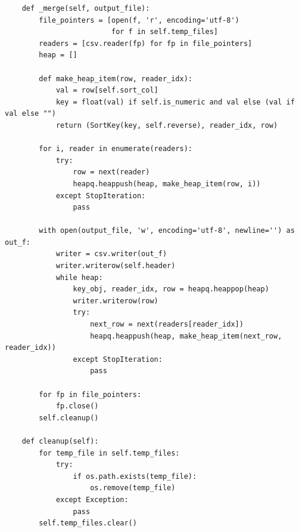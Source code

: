 \documentclass[oneside,a4paper,14pt]{extarticle}
\begin{document}
\begin{verbatim}
    def _merge(self, output_file):
        file_pointers = [open(f, 'r', encoding='utf-8')
                         for f in self.temp_files]
        readers = [csv.reader(fp) for fp in file_pointers]
        heap = []

        def make_heap_item(row, reader_idx):
            val = row[self.sort_col]
            key = float(val) if self.is_numeric and val else (val if val else "")
            return (SortKey(key, self.reverse), reader_idx, row)

        for i, reader in enumerate(readers):
            try:
                row = next(reader)
                heapq.heappush(heap, make_heap_item(row, i))
            except StopIteration:
                pass

        with open(output_file, 'w', encoding='utf-8', newline='') as out_f:
            writer = csv.writer(out_f)
            writer.writerow(self.header)
            while heap:
                key_obj, reader_idx, row = heapq.heappop(heap)
                writer.writerow(row)
                try:
                    next_row = next(readers[reader_idx])
                    heapq.heappush(heap, make_heap_item(next_row, reader_idx))
                except StopIteration:
                    pass

        for fp in file_pointers:
            fp.close()
        self.cleanup()

    def cleanup(self):
        for temp_file in self.temp_files:
            try:
                if os.path.exists(temp_file):
                    os.remove(temp_file)
            except Exception:
                pass
        self.temp_files.clear()
\end{verbatim}
\end{document}
